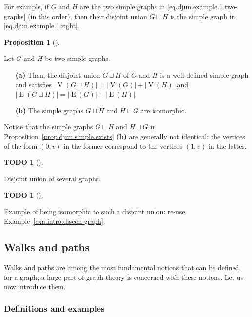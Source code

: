 \documentclass[numbers=enddot,12pt,final,onecolumn,notitlepage]{scrartcl}%
\theoremstyle{definition}
\newtheorem{prop}[theo]{Proposition}
\newenvironment{proposition}[1][]
{\begin{prop}[#1]\begin{leftbar}}
{\end{leftbar}\end{prop}}
\newtheorem{quest}[theo]{TODO}
\newenvironment{todo}[1][]
{\begin{quest}[#1]\begin{leftbar}}
{\end{leftbar}\end{quest}}
\newcommand{\abs}[1]{\left| #1 \right|}
\newcommand{\tup}[1]{\left( #1 \right)}
\newcommand{\verts}[1]{\operatorname{V}\left( #1 \right)}
\newcommand{\edges}[1]{\operatorname{E}\left( #1 \right)}
\begin{document}
For example, if $G$ and $H$ are the two simple graphs
in \eqref{eq.djun.example.1.two-graphs} (in this order),
then their disjoint union $G \sqcup H$ is the simple graph
in \eqref{eq.djun.example.1.right}.

\begin{proposition}
\label{prop.djun.simple.exists}
Let $G$ and $H$ be two simple graphs.

\begin{enumerate}

\item[\textbf{(a)}]
Then, the disjoint union $G \sqcup H$ of $G$ and $H$ is a
well-defined simple graph and satisfies
$\abs{\verts{G \sqcup H}} = \abs{\verts{G}} + \abs{\verts{H}}$
and
$\abs{\edges{G \sqcup H}} = \abs{\edges{G}} + \abs{\edges{H}}$.

\item[\textbf{(b)}]
The simple graphs $G \sqcup H$ and $H \sqcup G$ are
isomorphic.

\end{enumerate}

\end{proposition}

Notice that the simple graphs
$G \sqcup H$ and $H \sqcup G$ in
Proposition~\ref{prop.djun.simple.exists} \textbf{(b)}
are generally not identical; the vertices of the form
$\tup{0, v}$ in the former correspond to the vertices
$\tup{1, v}$ in the latter.

\begin{todo}
Disjoint union of several graphs.
\end{todo}

\begin{todo}
Example of being isomorphic to such a disjoint union:
re-use Example~\ref{exa.intro.discon-graph}.
\end{todo}


\subsection{\label{sect.intro.walks}Walks and paths}

Walks and paths are among the most fundamental notions that can be
defined for a graph; a large part of graph theory is concerned with
these notions. Let us now introduce them.

\subsubsection{Definitions and examples}
\end{document}
